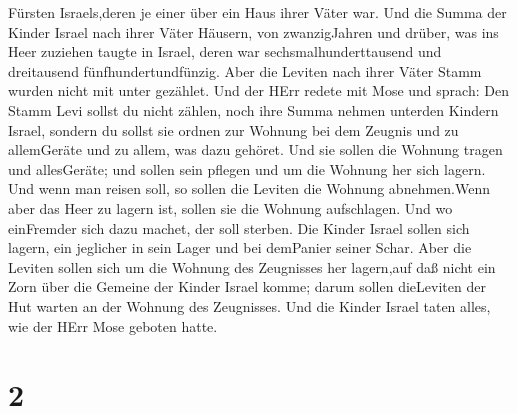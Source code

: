 Fürsten Israels,deren je einer über ein Haus ihrer Väter war.
 Und die Summa der Kinder Israel nach ihrer Väter Häusern,
von zwanzigJahren und drüber, was ins Heer zuziehen taugte in Israel,
 deren war sechsmalhunderttausend und dreitausend
fünfhundertundfünzig.  Aber die Leviten nach ihrer Väter
Stamm wurden nicht mit unter gezählet.  Und der HErr redete
mit Mose und sprach:  Den Stamm Levi sollst du nicht
zählen, noch ihre Summa nehmen unterden Kindern Israel, 
sondern du sollst sie ordnen zur Wohnung bei dem Zeugnis und zu
allemGeräte und zu allem, was dazu gehöret. Und sie sollen die Wohnung
tragen und allesGeräte; und sollen sein pflegen und um die Wohnung her
sich lagern.  Und wenn man reisen soll, so sollen die
Leviten die Wohnung abnehmen.Wenn aber das Heer zu lagern ist, sollen
sie die Wohnung aufschlagen. Und wo einFremder sich dazu machet, der
soll sterben.  Die Kinder Israel sollen sich lagern, ein
jeglicher in sein Lager und bei demPanier seiner Schar. 
Aber die Leviten sollen sich um die Wohnung des Zeugnisses her
lagern,auf daß nicht ein Zorn über die Gemeine der Kinder Israel komme;
darum sollen dieLeviten der Hut warten an der Wohnung des Zeugnisses.
 Und die Kinder Israel taten alles, wie der HErr Mose
geboten hatte.

\hypertarget{section-1}{%
\section{2}\label{section-1}}

